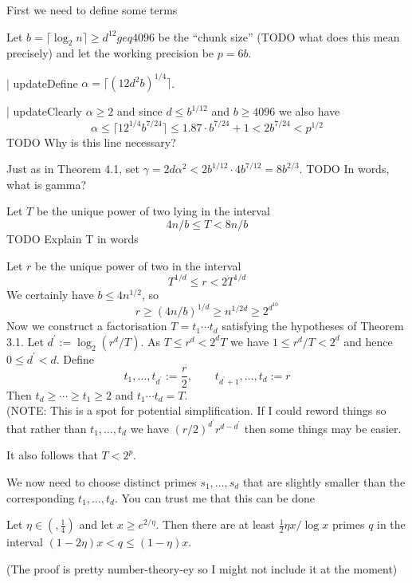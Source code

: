 First we need to define some terms

Let $b = \lceil \log_2 n\rceil \geq d^{12} geq 4096$ be the ``chunk size'' (TODO what does this mean precisely) and let the working precision be $p = 6b$.

 | updateDefine $\alpha = \lceil (12d^2 b)^{1/4}\rceil$.

 | updateClearly $\alpha \geq 2$ and since $d \leq b^{1/12}$ and $b \geq 4096$ we also have
\begin{equation}
    \alpha \leq \lceil 12^{1/4} b^{7/24}\rceil \leq 1.87 \cdot b^{7/24} + 1 < 2b^{7/24} < p^{1/2}
\end{equation}
TODO Why is this line necessary?

Just as in Theorem 4.1, set $\gamma = 2d\alpha^2 < 2b^{1/12} \cdot 4b^{7/12} = 8b^{2/3}$.
TODO In words, what is gamma?

Let $T$ be the unique power of two lying in the interval
\begin{equation}
    4n/b \leq T < 8n/b
\end{equation}
TODO Explain T in words

Let $r$ be the unique power of two in the interval
\[
    T^{1/d} \leq r < 2T^{1/d}
\]
We certainly have $b \leq 4n^{1/2}$, so
\[
    r \geq (4n/b)^{1/d} \geq n^{1/2d} \geq 2^{d^{10}}
\]
Now we construct a factorisation $T = t_1 \cdots t_d$ satisfying the hypotheses of Theorem 3.1. Let $d^\prime := \log_2(r^d / T)$. As $T \leq r^d < 2^d T$ we have $1 \leq r^d / T < 2^d$ and hence $0 \leq d^\prime < d$. Define
\[
    t_1, \ldots, t_{d^\prime} := \frac{r}{2}, \qquad t_{d^\prime + 1} , \ldots, t_d := r
\]
Then $t_d \geq \cdots \geq t_1 \geq 2$ and $t_1\cdots t_d = T$.\\
(NOTE: This is a spot for potential simplification. If I could reword things so that rather than $t_1, \ldots, t_d$ we have $(r/2)^{d^\prime} r^{d-d^\prime}$ then some things may be easier.

It also follows that $T < 2^p$.

We now need to choose distinct primes $s_1, \ldots, s_d$ that are slightly smaller than the corresponding $t_1, \ldots, t_d$. You can trust me that this can be done

\begin{lemma}
    Let $\eta \in (, \frac{1}{4})$ and let $x \geq e^{2/\eta}$. Then there are at least $\frac{1}{2}\eta x / \log x$ primes $q$ in the interval $(1 - 2\eta) x < q \leq ( 1 - \eta) x$.
\end{lemma}
(The proof is pretty number-theory-ey so I might not include it at the moment)

